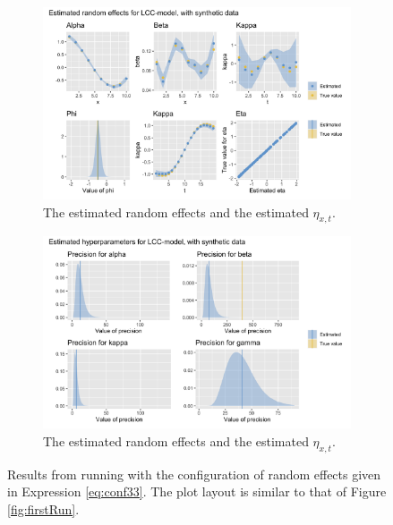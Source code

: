 \begin{figure}[h!]
    \centering
    \begin{subfigure}[b]{0.85\textwidth}
        \centering
        \includegraphics[width=\textwidth]{synthetic-data/Figures/effects-LCC-synthetic-3-3.png}
        \caption{The estimated random effects and the estimated $\eta_{x,t}$.}
        \label{fig:conf33-top}
    \end{subfigure}
    
    \begin{subfigure}[b]{0.6\textwidth}
        \centering
        \includegraphics[width=\textwidth]{synthetic-data/Figures/hyperparameters-LCC-synthetic-3-3.png}
        \caption{The estimated random effects and the estimated $\eta_{x,t}$.}
        \label{fig:conf33-bottom}
    \end{subfigure}
    \caption{Results from running \inlabru with the configuration of random effects given in Expression \ref{eq:conf33}. The plot layout is similar to that of Figure \ref{fig:firstRun}.}
    \label{fig:conf33}
\end{figure}
